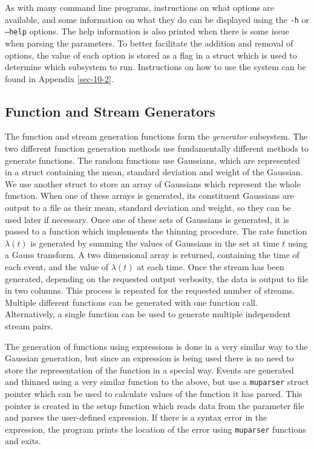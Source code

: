 \documentclass[a4paper,11pt,twoside]{article}
\begin{document}
   As with many command line programs, instructions on what options are
   available, and some information on what they do can be displayed using the
   \texttt{-h} or \texttt{--help} options. The help information is also printed
   when there is some issue when parsing the parameters. To better facilitate
   the addition and removal of options, the value of each option is stored as a
   flag in a struct which is used to determine which subsystem to
   run. Instructions on how to use the system can be found in Appendix \ref{sec-10-2}.
\subsection{Function and Stream Generators}
\label{sec-6-6}

   The function and stream generation functions form the \emph{generator}
   subsystem. The two different function generation methods use fundamentally
   different methods to generate functions. The random functions use Gaussians,
   which are represented in a struct containing the mean, standard deviation and
   weight of the Gaussian. We use another struct to store an array of Gaussians
   which represent the whole function. When one of these arrays is generated,
   its constituent Gaussians are output to a file as their mean, standard
   deviation and weight, so they can be used later if necessary. Once one of
   these sets of Gaussians is generated, it is passed to a function which
   implements the thinning procedure. The rate function $\lambda(t)$ is
   generated by summing the values of Gaussians in the set at time $t$ using a
   Gauss transform. A two dimensional array is returned, containing the time of
   each event, and the value of $\lambda(t)$ at each time. Once the stream has
   been generated, depending on the requested output verbosity, the data is
   output to file in two columns. This process is repeated for the requested
   number of streams. Multiple different functions can be generated with one
   function call. Alternatively, a single function can be used to generate
   multiple independent stream pairs.

   The generation of functions using expressions is done in a very similar way
   to the Gaussian generation, but since an expression is being used there is no
   need to store the representation of the function in a special way. Events are
   generated and thinned using a very similar function to the above, but use a
   \texttt{muparser} struct pointer which can be used to calculate values of the
   function it has parsed. This pointer is created in the setup function which
   reads data from the parameter file and parses the user-defined expression. If
   there is a syntax error in the expression, the program prints the location of
   the error using \texttt{muparser} functions and exits.
\end{document}
